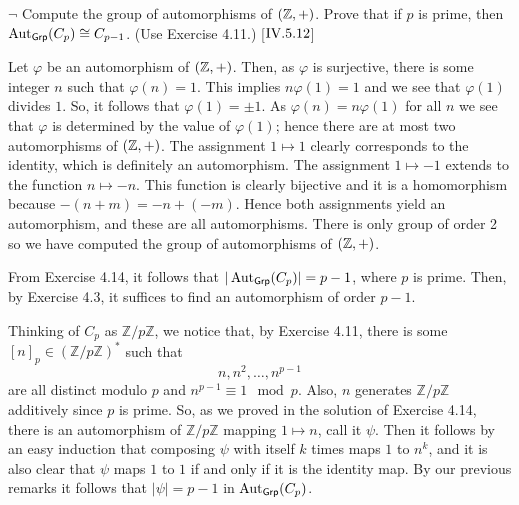 \begin{exercise}
	$\neg$ Compute the group of automorphisms of $(\mathbb{Z}, +)$. Prove that if $p$ is prime, then $\operatorname{Aut}_{\textsf{Grp}}(C_p)\cong C_{p-1}$. (Use Exercise 4.11.) [$\RNo{4}.5.12$]
\end{exercise}
\begin{solution}
	Let $\varphi$ be an automorphism of $(\mathbb{Z}, +)$. Then, as $\varphi$ is surjective, there is some integer $n$ such that $\varphi(n) = 1$. This implies $n\varphi(1) = 1$ and we see that $\varphi(1)$ divides $1$. So, it follows that $\varphi(1) = \pm1$. As $\varphi(n) = n\varphi(1)$ for all $n$ we see that $\varphi$ is determined by the value of $\varphi(1)$; hence there are at most two automorphisms of $(\mathbb{Z}, +)$. The assignment $1\mapsto 1$ clearly corresponds to the identity, which is definitely an automorphism. The assignment $1\mapsto -1$ extends to the function $n \mapsto -n$. This function is clearly bijective and it is a homomorphism because $-(n+m) = -n + (-m)$. Hence both assignments yield an automorphism, and these are all automorphisms. There is only group of order 2 so we have computed the group of automorphisms of $(\mathbb{Z}, +)$.
	
	From Exercise 4.14, it follows that $|\operatorname{Aut}_{\textsf{Grp}}(C_p)| = p-1$, where $p$ is prime. Then, by Exercise 4.3, it suffices to find an automorphism of order $p-1$. 
	
	Thinking of $C_p$ as $\mathbb{Z}/p\mathbb{Z}$, we notice that, by Exercise 4.11, there is some $[n]_p\in (\mathbb{Z}/p\mathbb{Z})^{*}$ such that
	\[
		n,n^2,\ldots,n^{p-1}
	\]
	are all distinct modulo $p$ and $n^{p-1} \equiv 1\mod p$. Also, $n$ generates $\mathbb{Z}/p\mathbb{Z}$ additively since $p$ is prime. So, as we proved in the solution of Exercise 4.14, there is an automorphism of $\mathbb{Z}/p\mathbb{Z}$ mapping $1\mapsto n$, call it $\psi$. Then it follows by an easy induction that composing $\psi$ with itself $k$ times maps $1$ to $n^k$, and it is also clear that $\psi$ maps $1$ to $1$ if and only if it is the identity map. By our previous remarks it follows that $|\psi| = p-1$ in $\operatorname{Aut}_{\textsf{Grp}}(C_p)$.
\end{solution}

